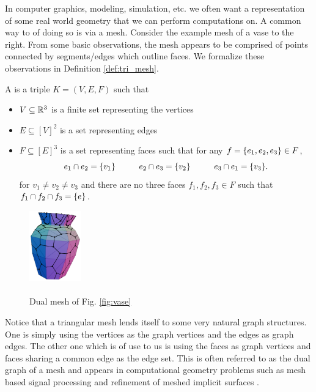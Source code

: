 \documentclass[11pt]{article}
\begin{document}
In computer graphics, modeling, simulation, etc. we often want a representation of some real world geometry that we can perform computations on. A common way to of doing so is via a mesh. Consider the example mesh of a vase to the right. From some basic observations, the mesh appears to be comprised of points connected by segments/edges which outline faces. We formalize these observations in Definition \ref{def:tri_mesh}.

\begin{definition}
    \label{def:tri_mesh}
    A  is a triple $K = (V, E, F)$ such that
    \begin{itemize}
        \item $V \subseteq \mathbb{R}^3$ is a finite set representing the vertices
        \item $E \subseteq [V]^2$ is a set representing edges
        \item $F \subseteq [E]^3$ is a set representing faces such that for any $f = \qty{e_1, e_2, e_3} \in F$, 
            \[
                e_1 \cap e_2 = \qty{v_1} \hspace{1cm} e_2 \cap e_3 = \qty{v_2} \hspace{1cm} e_3 \cap e_1 = \qty{v_3}
            .\]
            for $v_1 \neq v_2 \neq v_3$ and there are no three faces $f_1, f_2, f_3 \in F$ such that $f_1 \cap f_2 \cap f_3 = \qty{e}$.
    \end{itemize}
\end{definition}

\begin{figure}
    \vspace{-0.60cm}
    \begin{center}
        \includegraphics[width=0.20\textwidth]{vase_dual.png}
    \end{center}
    \caption{\\
        Dual mesh of Fig. \ref{fig:vase}}
    \label{fig:vase_dual}
\end{figure}

Notice that a triangular mesh lends itself to some very natural graph structures. One is simply using the vertices as the graph vertices and the edges as graph edges. The other one which is of use to us is using the faces as graph vertices and faces sharing a common edge as the edge set. This is often referred to as the dual graph of a mesh and appears in computational geometry problems such as mesh based signal processing \cite{taubinDualMeshResampling2002} and refinement of meshed implicit surfaces \cite{10.1145/566282.566308}. 
\end{document}
